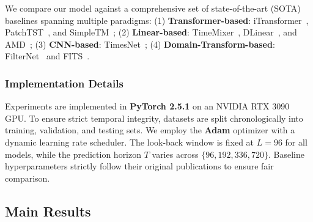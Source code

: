 \documentclass[final,3p,times]{elsarticle}
\begin{document}
We compare our model against a comprehensive set of state-of-the-art (SOTA) baselines spanning multiple paradigms:
(1) \textbf{Transformer-based}: iTransformer~\cite{liu2024itransformer}, PatchTST~\cite{nie2023a}, and SimpleTM~\cite{chen2025simpletm};
(2) \textbf{Linear-based}: TimeMixer~\cite{wang2024timemixer}, DLinear~\cite{zeng2023transformers}, and AMD~\cite{hu2025adaptive};
(3) \textbf{CNN-based}: TimesNet~\cite{wu2023timesnet};
(4) \textbf{Domain-Transform-based}: FilterNet~\cite{yi2024filternet} and FITS~\cite{xu2024fits}.

\subsubsection{Implementation Details}

Experiments are implemented in \textbf{PyTorch 2.5.1} on an NVIDIA RTX 3090 GPU. To ensure strict temporal integrity, datasets are split chronologically into training, validation, and testing sets. We employ the \textbf{Adam} optimizer with a dynamic learning rate scheduler. The look-back window is fixed at $L=96$ for all models, while the prediction horizon $T$ varies across $\{96, 192, 336, 720\}$. Baseline hyperparameters strictly follow their original publications to ensure fair comparison.

\subsection{Main Results}
\end{document}
